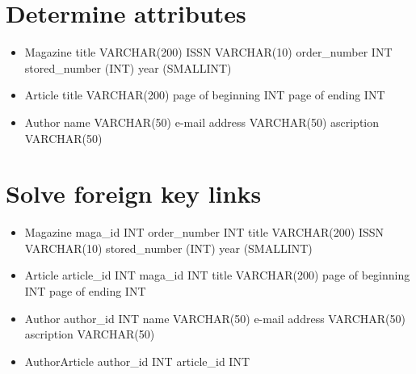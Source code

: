 \documentclass{article}
\begin{document}
\section{Determine attributes}
\begin{itemize}
    \item Magazine
    \subitem title VARCHAR(200)
    \subitem ISSN VARCHAR(10)
    \subitem order\_number INT 
    \subitem stored\_number (INT)
    \subitem year (SMALLINT)
    
    \item Article
    \subitem title VARCHAR(200)
    \subitem page of beginning INT 
    \subitem page of ending INT
    
    \item Author
    \subitem name VARCHAR(50)
    \subitem e-mail address VARCHAR(50)
    \subitem ascription VARCHAR(50)
    
\end{itemize}

\section{Solve foreign key links}
\begin{itemize}
    \item Magazine
    \subitem maga\_id INT 
    \subitem order\_number INT 
    \subitem title VARCHAR(200)
    \subitem ISSN VARCHAR(10)
    \subitem stored\_number (INT)
    \subitem year (SMALLINT)
    
    \item Article
    \subitem article\_id INT
    \subitem maga\_id INT
    \subitem title VARCHAR(200)
    \subitem page of beginning INT 
    \subitem page of ending INT
    
    \item Author
    \subitem author\_id INT
    \subitem name VARCHAR(50)
    \subitem e-mail address VARCHAR(50)
    \subitem ascription VARCHAR(50)

    
    \item AuthorArticle
    \subitem author\_id INT
    \subitem article\_id INT
\end{itemize}
\end{document}
